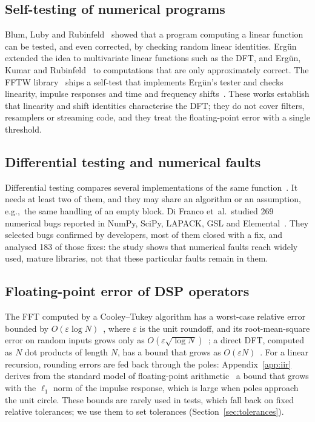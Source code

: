 \documentclass[10pt,conference]{IEEEtran}
\newcommand{\eps}{\varepsilon}
\newcommand{\eg}{e.g.,\ }
\begin{document}
\subsection{Self-testing of numerical programs}
Blum, Luby and Rubinfeld~\cite{blum1993selftesting} showed that a program
computing a linear function can be tested, and even corrected, by checking
random linear identities. Erg\"un~\cite{ergun1995testing,ergun2000selftesting}
extended the idea to multivariate linear functions such as the DFT, and
Erg\"un, Kumar and Rubinfeld~\cite{ergun2001checking} to computations that are
only approximately correct. The FFTW library~\cite{frigo2005fftw} ships a
self-test that implements Erg\"un's tester and checks linearity, impulse
responses and time and frequency shifts~\cite{fftwverify}. These works establish that
linearity and shift identities characterise the DFT; they do not cover
filters, resamplers or streaming code, and they treat the floating-point error
with a single threshold.

\subsection{Differential testing and numerical faults}
Differential testing compares several implementations of the same
function~\cite{vanover2020fpdiff}. It needs at least two of them, and they may
share an algorithm or an assumption, \eg the same handling of an empty block.
Di Franco et~al.\ studied 269 numerical bugs reported in NumPy, SciPy,
LAPACK, GSL and Elemental~\cite{difranco2017floatingpoint}. They selected bugs
confirmed by developers, most of them closed with a fix, and analysed 183 of
those fixes: the study shows that numerical faults reach widely used, mature
libraries, not that these particular faults remain in them.

\subsection{Floating-point error of DSP operators}
The FFT computed by a Cooley--Tukey algorithm has a worst-case relative error
bounded by $O(\eps\log N)$~\cite{higham2002accuracy}, where $\eps$ is the unit
roundoff, and its root-mean-square error on random inputs grows only as
$O(\eps\sqrt{\log N})$~\cite{schatzman1996accuracy}; a direct DFT, computed as $N$
dot products of length $N$, has a bound that grows as
$O(\eps N)$~\cite{higham2002accuracy}. For a linear recursion, rounding errors
are fed back through the poles: Appendix~\ref{app:iir} derives from the
standard model of floating-point arithmetic~\cite{higham2002accuracy} a bound
that grows with the $\ell_1$ norm of the impulse response, which is large when
poles approach the unit circle. These bounds are
rarely used in tests, which fall back on fixed relative tolerances; we use them
to set tolerances (Section~\ref{sec:tolerances}).
\end{document}
